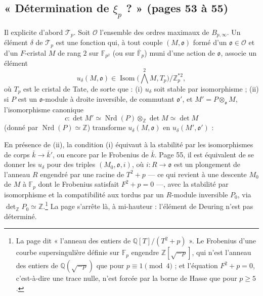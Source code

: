 \documentclass[11pt,a4paper]{article}
\begin{document}
\subsection*{« Détermination de $\xi_{p}$ ? » (pages 53 à 55)}

Il explicite d'abord $\mathcal{T}_{p}$. Soit $\mathcal{O}$ l'ensemble des ordres
maximaux de $B_{p,\infty}$. Un élément $\delta$ de $\mathcal{T}_{p}$ est une
fonction qui, à tout couple $(M, \mathfrak{o})$ formé d'un $\mathfrak{o} \in
\mathcal{O}$ et d'un $F$-cristal $M$ de rang $2$ sur $\mathbb{F}_{p^{2}}$ (ou sur
$\overline{\mathbb{F}}_{p}$) muni d'une action de $\mathfrak{o}$, associe un
élément
\[
  u_{\delta}(M, \mathfrak{o}) \in \operatorname{Isom}\bigl( \textstyle\bigwedge^{2}
  M, T_{p} \bigr) / \mathbb{Z}_{p}^{*2} ,
\]
où $T_{p}$ est le cristal de Tate, de sorte que : (i) $u_{\delta}$ soit stable
par isomorphisme ; (ii) si $P$ est un $\mathfrak{o}$-module à droite inversible,
de commutant $\mathfrak{o}'$, et $M' = P \otimes_{\mathfrak{o}} M$, l'isomorphisme
canonique
\[
  c \colon \det M' \simeq \operatorname{Nrd}(P) \otimes_{\mathbb{Z}} \det M
  \simeq \det M
\]
(donné par $\operatorname{Nrd}(P) \simeq \mathbb{Z}$) transforme $u_{\delta}(M,
\mathfrak{o})$ en $u_{\delta}(M', \mathfrak{o}')$ :


En présence de (ii), la condition (i) équivaut à la stabilité par les
isomorphismes de corps $\bar{k} \to \bar{k}'$, ou encore par le Frobenius de
$\bar{k}$. Page 55, il est équivalent de se donner les $u_{\delta}$ pour des
triples $(M_{0}, \mathfrak{o}, i)$, où $i \colon R \to \mathfrak{o}$ est un
plongement de l'anneau $R$ engendré par une racine de $T^{2} + p$ --- ce qui
revient à une descente $M_{0}$ de $M$ à $\mathbb{F}_{p}$ dont le Frobenius
satisfait $F^{2} + p = 0$ ---, avec la stabilité par isomorphisme et la
compatibilité aux tordus par un $R$-module inversible $P_{0}$, via
$\det_{\mathbb{Z}} P_{0} \simeq \mathbb{Z}$.\footnote{La page dit « l'anneau des
entiers de $\mathbb{Q}[T]/(T^{2} + p)$ ». Le Frobenius d'une courbe
supersingulière définie sur $\mathbb{F}_{p}$ engendre $\mathbb{Z}[\sqrt{-p}]$,
qui n'est l'anneau des entiers de $\mathbb{Q}(\sqrt{-p})$ que pour $p \equiv 1
\pmod 4$ ; et l'équation $F^{2} + p = 0$, c'est-à-dire une trace nulle, n'est
forcée par la borne de Hasse que pour $p \geqslant 5$.} La page s'arrête là, à
mi-hauteur : l'élément de Deuring n'est pas déterminé.
\end{document}
